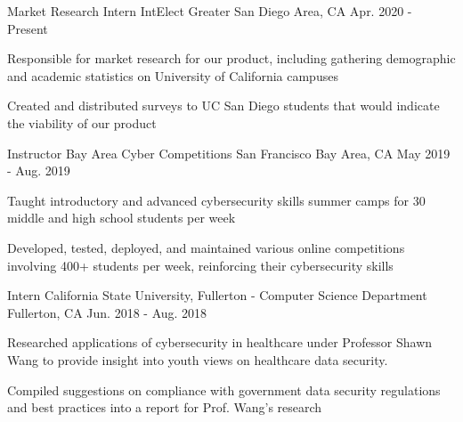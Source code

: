 

\begin{cventries}

\cventry
{Market Research Intern} %
{IntElect} %
{Greater San Diego Area, CA} %
{Apr. 2020 - Present} %
{
  \begin{cvitems} %
    \item {Responsible for market research for our product, including gathering demographic and academic statistics on University of California campuses}
    \item {Created and distributed surveys to UC San Diego students that would indicate the viability of our product}
  \end{cvitems}
}

  \cventry
    {Instructor} %
    {Bay Area Cyber Competitions} %
    {San Francisco Bay Area, CA} %
    {May 2019 - Aug. 2019} %
    {
      \begin{cvitems} %
        \item {Taught introductory and advanced cybersecurity skills summer camps for 30 middle and high school students per week}
        \item {Developed, tested, deployed, and maintained various online competitions involving 400+ students per week, reinforcing their cybersecurity skills}
      \end{cvitems}
    }

  \cventry
    {Intern} %
    {California State University, Fullerton - Computer Science Department} %
    {Fullerton, CA} %
    {Jun. 2018 - Aug. 2018} %
    {
      \begin{cvitems} %
        \item {Researched applications of cybersecurity in healthcare under Professor Shawn Wang to provide insight into youth views on healthcare data security.}
        \item {Compiled suggestions on compliance with government data security regulations and best practices into a report for Prof. Wang's research}
      \end{cvitems}
    }

\end{cventries}
